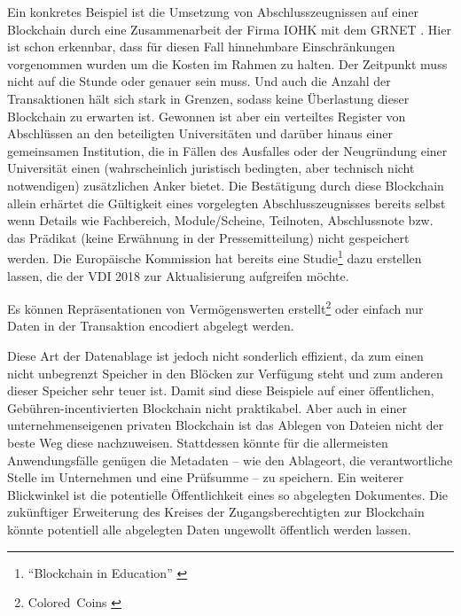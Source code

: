 Ein konkretes Beispiel ist die Umsetzung von Abschlusszeugnissen auf einer Blockchain durch eine Zusammenarbeit der Firma IOHK mit dem \gls{GRNET} \autocite{w:abschluesse-blockchain}. Hier ist schon erkennbar, dass für diesen Fall hinnehmbare Einschränkungen vorgenommen wurden um die Kosten im Rahmen zu halten. Der Zeitpunkt muss nicht auf die Stunde oder genauer sein muss. Und auch die Anzahl der Transaktionen hält sich stark in Grenzen, sodass keine Überlastung dieser Blockchain zu erwarten ist. Gewonnen ist aber ein verteiltes Register von Abschlüssen an den beteiligten Universitäten und darüber hinaus einer gemeinsamen Institution, die in Fällen des Ausfalles oder der Neugründung einer Universität einen (wahrscheinlich juristisch bedingten, aber technisch nicht notwendigen) zusätzlichen Anker bietet. Die Bestätigung durch diese Blockchain allein erhärtet die Gültigkeit eines vorgelegten Abschlusszeugnisses bereits selbst wenn Details wie Fachbereich, Module/Scheine, Teilnoten, Abschlussnote bzw. das Prädikat (keine Erwähnung in der Pressemitteilung) nicht gespeichert werden. Die Europäische Kommission hat bereits eine Studie\footnote{\enquote{Blockchain in Education} \autocite{p:bc-edu-eurocommission}} dazu erstellen lassen, die der \gls{VDI} 2018 zur Aktualisierung aufgreifen möchte.

Es können \ua{} Repräsentationen von Vermögenswerten erstellt\footnote{Colored~Coins \autocite{b:mastering-bitcoin}} oder einfach nur Daten in der Transaktion encodiert abgelegt werden.

Diese Art der Datenablage ist jedoch nicht sonderlich effizient, da zum einen nicht unbegrenzt Speicher in den Blöcken zur Verfügung steht und zum anderen dieser Speicher sehr teuer ist.
Damit sind diese Beispiele auf einer öffentlichen, Gebühren-incentivierten Blockchain nicht praktikabel.
Aber auch in einer unternehmenseigenen privaten Blockchain ist das Ablegen von Dateien nicht der beste Weg diese nachzuweisen.
Stattdessen könnte für die allermeisten Anwendungsfälle genügen die Metadaten -- wie \zB{} den Ablageort, die verantwortliche Stelle im Unternehmen und eine Prüfsumme -- zu speichern.
Ein weiterer Blickwinkel ist die potentielle Öffentlichkeit eines so abgelegten Dokumentes.
Die zukünftiger Erweiterung des Kreises der Zugangsberechtigten zur Blockchain könnte potentiell alle abgelegten Daten ungewollt öffentlich werden lassen.



